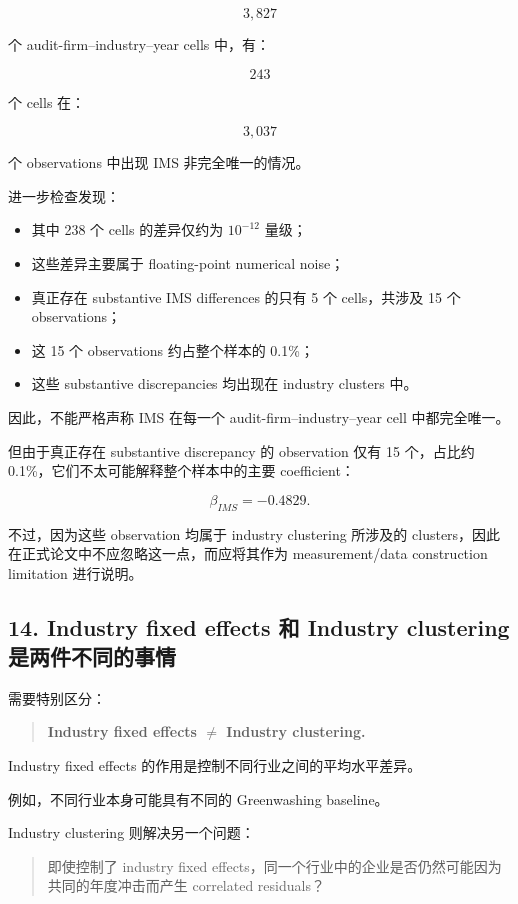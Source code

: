 \documentclass[11pt]{article}
\begin{document}
\[
3,827
\]

个 audit-firm--industry--year cells 中，有：

\[
243
\]

个 cells 在：

\[
3,037
\]

个 observations 中出现 IMS 非完全唯一的情况。

进一步检查发现：

\begin{itemize}
    \item 其中 238 个 cells 的差异仅约为 $10^{-12}$ 量级；
    \item 这些差异主要属于 floating-point numerical noise；
    \item 真正存在 substantive IMS differences 的只有 5 个 cells，共涉及 15 个 observations；
    \item 这 15 个 observations 约占整个样本的 0.1\%；
    \item 这些 substantive discrepancies 均出现在 industry clusters 中。
\end{itemize}

因此，不能严格声称 IMS 在每一个 audit-firm--industry--year cell 中都完全唯一。

但由于真正存在 substantive discrepancy 的 observation 仅有 15 个，占比约 0.1\%，它们不太可能解释整个样本中的主要 coefficient：

\[
\beta_{IMS}=-0.4829.
\]

不过，因为这些 observation 均属于 industry clustering 所涉及的 clusters，因此在正式论文中不应忽略这一点，而应将其作为 measurement/data construction limitation 进行说明。

\subsection{14. Industry fixed effects 和 Industry clustering 是两件不同的事情}

需要特别区分：

\begin{quote}
\textbf{Industry fixed effects $\neq$ Industry clustering.}
\end{quote}

Industry fixed effects 的作用是控制不同行业之间的平均水平差异。

例如，不同行业本身可能具有不同的 Greenwashing baseline。

Industry clustering 则解决另一个问题：

\begin{quote}
即使控制了 industry fixed effects，同一个行业中的企业是否仍然可能因为共同的年度冲击而产生 correlated residuals？
\end{quote}
\end{document}
